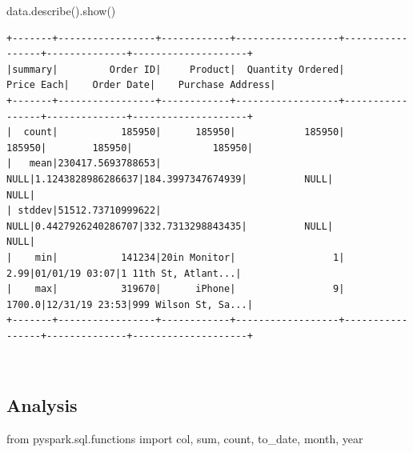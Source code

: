 \documentclass[
  letterpaper,
  DIV=11,
  numbers=noendperiod]{scrartcl}
\newenvironment{Shaded}{\begin{snugshade}}{\end{snugshade}}
\newcommand{\BuiltInTok}[1]{\textcolor[rgb]{0.00,0.23,0.31}{#1}}
\newcommand{\ImportTok}[1]{\textcolor[rgb]{0.00,0.46,0.62}{#1}}
\newcommand{\NormalTok}[1]{\textcolor[rgb]{0.00,0.23,0.31}{#1}}
\begin{document}
\begin{Shaded}
\begin{Highlighting}[]
\NormalTok{data.describe().show()}
\end{Highlighting}
\end{Shaded}

\begin{verbatim}
+-------+-----------------+------------+------------------+-----------------+--------------+--------------------+
|summary|         Order ID|     Product|  Quantity Ordered|       Price Each|    Order Date|    Purchase Address|
+-------+-----------------+------------+------------------+-----------------+--------------+--------------------+
|  count|           185950|      185950|            185950|           185950|        185950|              185950|
|   mean|230417.5693788653|        NULL|1.1243828986286637|184.3997347674939|          NULL|                NULL|
| stddev|51512.73710999622|        NULL|0.4427926240286707|332.7313298843435|          NULL|                NULL|
|    min|           141234|20in Monitor|                 1|             2.99|01/01/19 03:07|1 11th St, Atlant...|
|    max|           319670|      iPhone|                 9|           1700.0|12/31/19 23:53|999 Wilson St, Sa...|
+-------+-----------------+------------+------------------+-----------------+--------------+--------------------+
\end{verbatim}

\begin{verbatim}
                                                                                
\end{verbatim}

\subsection{Analysis}\label{analysis}

\begin{Shaded}
\begin{Highlighting}[]
\ImportTok{from}\NormalTok{ pyspark.sql.functions }\ImportTok{import}\NormalTok{ col, }\BuiltInTok{sum}\NormalTok{, count, to\_date, month, year}
\end{Highlighting}
\end{Shaded}
\end{document}
